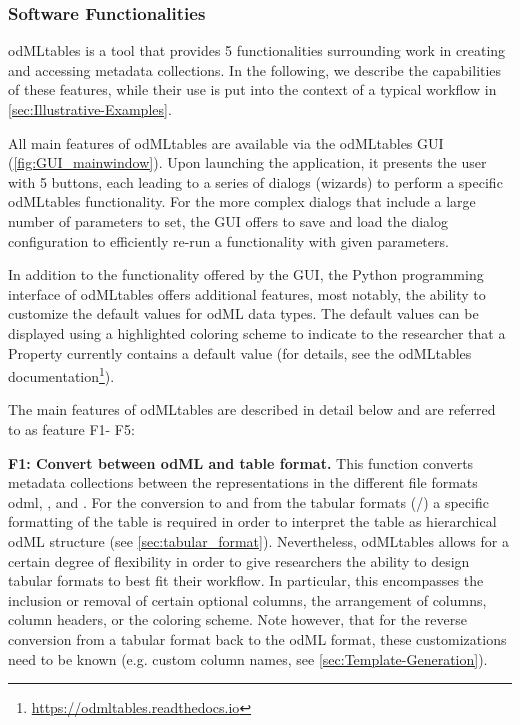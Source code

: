 {\subsubsection{Software Functionalities}
\label{sec:software_functionalities} 

odMLtables is a tool that provides 5 functionalities surrounding work in creating and accessing metadata collections. In the following, we describe the capabilities of these features, while their use is put into the context of a typical workflow in \cref{sec:Illustrative-Examples}.

All main features of odMLtables are available via the odMLtables GUI (\cref{fig:GUI_mainwindow}). Upon launching the application, it presents the user with 5 buttons, each leading to a series of dialogs (wizards) to perform a specific odMLtables functionality. For the more complex dialogs that include a large number of parameters to set, the GUI offers to save and load the dialog configuration to efficiently re-run a functionality with given parameters. 

In addition to the functionality offered by the GUI, the Python programming interface of odMLtables offers additional features, most notably, the ability to customize the default values for odML data types. The default values can be displayed using a highlighted coloring scheme to indicate to the researcher that a Property currently contains a default value (for details, see the odMLtables documentation\footnote{\url{https://odmltables.readthedocs.io}}).

\def\fconvert{F1}
\def\fgenerate{F2} 
\def\fcompare{F3}
\def\fmerge{F4}
\def\ffilter{F5} 

The main features of odMLtables are described in detail below and are referred to as feature \fconvert - \ffilter:


\textbf{\fconvert: Convert between odML and table format.}
This function converts metadata collections between the representations in the different file formats odml, , and . For the conversion to and from the tabular formats (/) a specific formatting of the table is required in order to interpret the table as hierarchical odML structure (see \cref{sec:tabular_format}). Nevertheless, odMLtables allows for a certain degree of flexibility in order to give researchers the ability to design tabular formats to best fit their workflow. In particular, this encompasses the inclusion or removal of certain optional columns, the arrangement of columns, column headers, or the coloring scheme. Note however, that for the reverse conversion from a tabular format back to the odML format, these customizations need to be known (e.g. custom column names, see \cref{sec:Template-Generation}).

}
